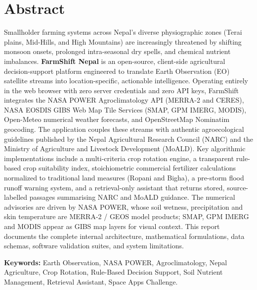 \documentclass[11pt,a4paper]{report}
\begin{document}

\chapter*{Abstract}
Smallholder farming systems across Nepal's diverse physiographic zones (Terai plains, Mid-Hills, and High Mountains) are increasingly threatened by shifting monsoon onsets, prolonged intra-seasonal dry spells, and chemical nutrient imbalances. \textbf{FarmShift Nepal} is an open-source, client-side agricultural decision-support platform engineered to translate Earth Observation (EO) satellite streams into location-specific, actionable intelligence. Operating entirely in the web browser with zero server credentials and zero API keys, FarmShift integrates the NASA POWER Agroclimatology API (MERRA-2 and CERES), NASA EOSDIS GIBS Web Map Tile Services (SMAP, GPM IMERG, MODIS), Open-Meteo numerical weather forecasts, and OpenStreetMap Nominatim geocoding. The application couples these streams with authentic agroecological guidelines published by the Nepal Agricultural Research Council (NARC) and the Ministry of Agriculture and Livestock Development (MoALD). Key algorithmic implementations include a multi-criteria crop rotation engine, a transparent rule-based crop suitability index, stoichiometric commercial fertilizer calculations normalized to traditional land measures (Ropani and Bigha), a pre-storm flood runoff warning system, and a retrieval-only assistant that returns stored, source-labelled passages summarising NARC and MoALD guidance. The numerical advisories are driven by NASA POWER, whose soil wetness, precipitation and skin temperature are MERRA-2 / GEOS model products; SMAP, GPM IMERG and MODIS appear as GIBS map layers for visual context. This report documents the complete internal architecture, mathematical formulations, data schemas, software validation suites, and system limitations.

\vspace{0.8cm}
\noindent \textbf{Keywords:} Earth Observation, NASA POWER, Agroclimatology, Nepal Agriculture, Crop Rotation, Rule-Based Decision Support, Soil Nutrient Management, Retrieval Assistant, Space Apps Challenge.
\end{document}
